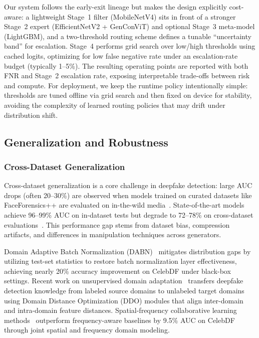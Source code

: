 Our system follows the early\hyp exit lineage but makes the design explicitly cost\hyp aware: a lightweight Stage~1 filter (MobileNetV4) sits in front of a stronger Stage~2 expert (EfficientNetV2 + GenConViT) and optional Stage~3 meta\hyp model (LightGBM), and a two\hyp threshold routing scheme defines a tunable ``uncertainty band'' for escalation. Stage~4 performs grid search over low/high thresholds using cached logits, optimizing for low false negative rate under an escalation\hyp rate budget (typically 1–5\%). The resulting operating points are reported with both FNR and Stage~2 escalation rate, exposing interpretable trade\hyp offs between risk and compute. For deployment, we keep the runtime policy intentionally simple: thresholds are tuned offline via grid search and then fixed on device for stability, avoiding the complexity of learned routing policies that may drift under distribution shift.

\subsection*{Generalization and Robustness}

\subsubsection*{Cross-Dataset Generalization}
Cross\hyp dataset generalization is a core challenge in deepfake detection: large AUC drops (often 20–30\%) are observed when models trained on curated datasets like FaceForensics++ are evaluated on in\hyp the\hyp wild media~\cite{wilddeepfake2021,pei2024deepfakesurvey}. State\hyp of\hyp the\hyp art models achieve 96–99\% AUC on in\hyp dataset tests but degrade to 72–78\% on cross\hyp dataset evaluations~\cite{zhang2024deepfakebench}. This performance gap stems from dataset bias, compression artifacts, and differences in manipulation techniques across generators.

Domain Adaptive Batch Normalization (DABN)~\cite{li2021dabn} mitigates distribution gaps by utilizing test\hyp set statistics to restore batch normalization layer effectiveness, achieving nearly 20\% accuracy improvement on CelebDF under black\hyp box settings. Recent work on unsupervised domain adaptation~\cite{liu2025unsupervised_da} transfers deepfake detection knowledge from labeled source domains to unlabeled target domains using Domain Distance Optimization (DDO) modules that align inter\hyp domain and intra\hyp domain feature distances. Spatial\hyp frequency collaborative learning methods~\cite{wang2025spatial_freq} outperform frequency\hyp aware baselines by 9.5\% AUC on CelebDF through joint spatial and frequency domain modeling.

